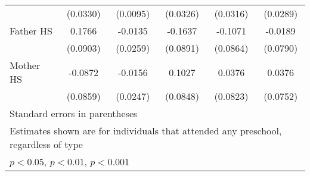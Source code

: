 \begin{table}[htbp]
\begin{tabular}{l*{5}{c}}
            &    (0.0330)         &    (0.0095)         &    (0.0326)         &    (0.0316)         &    (0.0289)         \\
\addlinespace
Father HS   &      0.1766         &     -0.0135         &     -0.1637         &     -0.1071         &     -0.0189         \\
            &    (0.0903)         &    (0.0259)         &    (0.0891)         &    (0.0864)         &    (0.0790)         \\
\addlinespace
Mother HS   &     -0.0872         &     -0.0156         &      0.1027         &      0.0376         &      0.0376         \\
            &    (0.0859)         &    (0.0247)         &    (0.0848)         &    (0.0823)         &    (0.0752)         \\
\bottomrule
\multicolumn{6}{l}{\footnotesize Standard errors in parentheses}\\
\multicolumn{6}{l}{\footnotesize Estimates shown are for individuals that attended any preschool, regardless of type}\\
\multicolumn{6}{l}{\footnotesize \sym{*} \(p<0.05\), \sym{**} \(p<0.01\), \sym{***} \(p<0.001\)}\\
\end{tabular}
\end{table}
